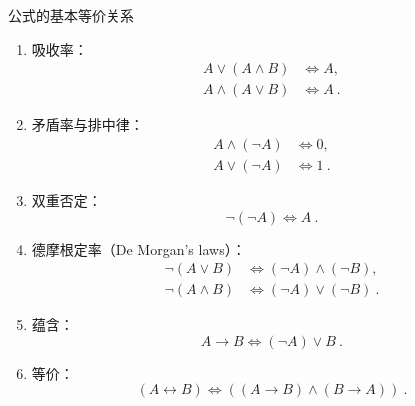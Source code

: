 \begin{theorem}{公式的基本等价关系}
\begin{enumerate}
\item 吸收率：
\begin{equation}
\begin{aligned}
A \lor (A \land B) &\Leftrightarrow A, \\
A \land (A \lor B) &\Leftrightarrow A ~.
\end{aligned}
\end{equation}
\item 矛盾率与排中律：
\begin{equation}
\begin{aligned}
A \land (\neg A) &\Leftrightarrow 0, \\
A \lor (\neg A) &\Leftrightarrow 1~.
\end{aligned}
\end{equation}
\item 双重否定：
\begin{equation}
\neg (\neg A) \Leftrightarrow A ~.
\end{equation}
\item 德摩根定率（De Morgan's laws）：
\begin{equation}
\begin{aligned}
\neg(A \lor B) &\Leftrightarrow (\neg A) \land (\neg B) , \\
\neg(A \land B) &\Leftrightarrow (\neg A) \lor (\neg B) ~.
\end{aligned}
\end{equation}
\item 蕴含：
\begin{equation}
A \to B \Leftrightarrow (\neg A) \lor B~.
\end{equation}
\item 等价：
\begin{equation}
(A \leftrightarrow B) \Leftrightarrow ((A \to B) \land (B \to A)) ~.
\end{equation}



\end{enumerate}
\end{theorem}